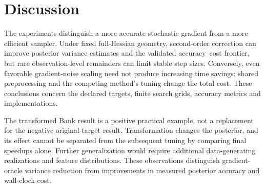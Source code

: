 \documentclass[ba]{imsart}
\theoremstyle{plain}
\theoremstyle{definition}
\begin{document}
\section{Discussion}\label{sec:discussion}
The experiments distinguish a more accurate stochastic gradient from a more efficient sampler. Under fixed full-Hessian geometry, second-order correction can improve posterior variance estimates and the validated accuracy--cost frontier, but rare observation-level remainders can limit stable step sizes. Conversely, even favorable gradient-noise scaling need not produce increasing time savings: shared preprocessing and the competing method's tuning change the total cost. These conclusions concern the declared targets, finite search grids, accuracy metrics and implementations.

The transformed Bank result is a positive practical example, not a replacement for the negative original-target result. Transformation changes the posterior, and its effect cannot be separated from the subsequent tuning by comparing final speedups alone. Further generalization would require additional data-generating realizations and feature distributions. These observations distinguish gradient-oracle variance reduction from improvements in measured posterior accuracy and wall-clock cost.
\appendix




\end{document}

